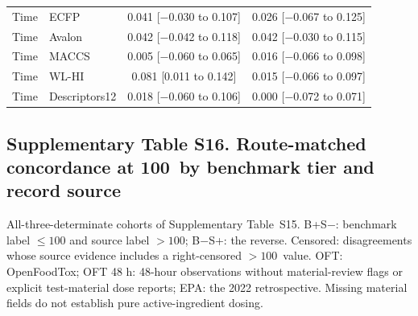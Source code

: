 \begin{longtable}{llcc}
Time & ECFP & 0.041 [$-$0.030 to 0.107] & 0.026 [$-$0.067 to 0.125] \\

Time & Avalon & 0.042 [$-$0.042 to 0.118] & 0.042 [$-$0.030 to 0.115] \\

Time & MACCS & 0.005 [$-$0.060 to 0.065] & 0.016 [$-$0.066 to 0.098] \\

Time & WL-HI & 0.081 [0.011 to 0.142] & 0.015 [$-$0.066 to 0.097] \\

Time & Descriptors12 & 0.018 [$-$0.060 to 0.106] & 0.000 [$-$0.072 to 0.071] \\

\end{longtable}\endgroup

\subsection*{Supplementary Table S16. Route-matched concordance at 100~\ugbee by benchmark tier and record source}

All-three-determinate cohorts of Supplementary Table~S15. B+S$-$: benchmark label $\leq100$ and source label $>100$; B$-$S+: the reverse. Censored: disagreements whose source evidence includes a right-censored $>100$~\ugbee value. OFT: OpenFoodTox; OFT 48 h: 48-hour observations without material-review flags or explicit test-material dose reports; EPA: the 2022 retrospective. Missing material fields do not establish pure active-ingredient dosing.

\begingroup\footnotesize\setlength{\tabcolsep}{3pt}

